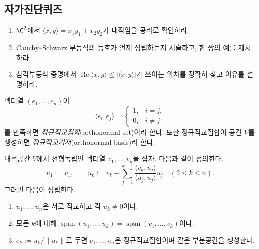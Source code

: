 \subsection*{자가진단퀴즈}
\begin{enumerate}[label=\arabic*.]
\item $\C^2$에서 $\langle x,y\rangle=x_1\overline{y_1}+x_2\overline{y_2}$가 내적임을 공리로 확인하라.
\item Cauchy--Schwarz 부등식의 등호가 언제 성립하는지 서술하고, 한 쌍의 예를 제시하라.
\item 삼각부등식 증명에서 $\operatorname{Re}\langle x,y\rangle\le |\langle x,y\rangle|$가 쓰이는 위치를 정확히 찾고 이유를 설명하라.
\end{enumerate}


\begin{definition}
벡터열 $(e_1,\dots,e_n)$이
$$
\langle e_i,e_j\rangle=
\begin{cases}
1,& i=j,\\
0,& i\ne j
\end{cases}
$$
를 만족하면 \emph{정규직교집합}(orthonormal set)이라 한다. 또한 정규직교집합이 공간 $V$를 생성하면 \emph{정규직교기저}(orthonormal basis)라 한다.
\end{definition}

\begin{theorem}
내적공간 $V$에서 선형독립인 벡터열 $v_1,\dots,v_n$을 잡자. 다음과 같이 정의한다.
$$
u_1:=v_1,\qquad
u_k:=v_k-\sum_{j=1}^{k-1}\frac{\langle v_k,u_j\rangle}{\langle u_j,u_j\rangle}u_j\quad(2\le k\le n).
$$
그러면 다음이 성립한다.
\begin{enumerate}[label=(\roman*)]
\item $u_1,\dots,u_n$은 서로 직교하고 각 $u_k\ne0$이다.
\item 모든 $k$에 대해 $\operatorname{span}(u_1,\dots,u_k)=\operatorname{span}(v_1,\dots,v_k)$이다.
\item $e_k:=u_k/\|u_k\|$로 두면 $e_1,\dots,e_n$은 정규직교집합이며 같은 부분공간을 생성한다.
\end{enumerate}
\end{theorem}

